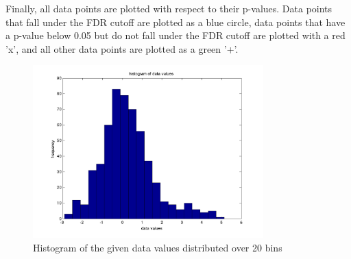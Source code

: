 \documentclass{acm_proc_article-sp}
\begin{document}
Finally, all data points are plotted with respect to their p-values.  Data points that fall under the FDR cutoff are plotted as a blue circle, data points that have a p-value below 0.05 but do not fall under the FDR cutoff are plotted with a red 'x', and all other data points are plotted as a green '+'.  

\begin{figure}[t]
\centering
   \includegraphics[width=3.5in]{hist.png}
\caption{Histogram of the given data values distributed over 20 bins}
\end{figure}
\end{document}
